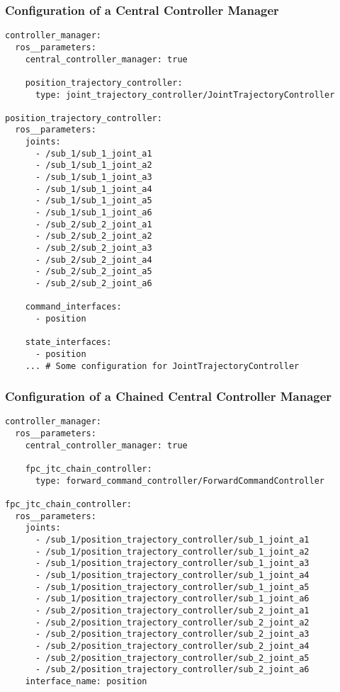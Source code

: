 \subsubsection{Configuration of a Central Controller Manager}
\lstset{language=yaml,basicstyle=\scriptsize}
\begin{lstlisting}[caption=Example configuration of a central controller manager with a joint trajecotry controller.]
controller_manager:
  ros__parameters:
    central_controller_manager: true
    
    position_trajectory_controller:
      type: joint_trajectory_controller/JointTrajectoryController

position_trajectory_controller:
  ros__parameters:
    joints:
      - /sub_1/sub_1_joint_a1
      - /sub_1/sub_1_joint_a2
      - /sub_1/sub_1_joint_a3
      - /sub_1/sub_1_joint_a4
      - /sub_1/sub_1_joint_a5
      - /sub_1/sub_1_joint_a6
      - /sub_2/sub_2_joint_a1
      - /sub_2/sub_2_joint_a2
      - /sub_2/sub_2_joint_a3
      - /sub_2/sub_2_joint_a4
      - /sub_2/sub_2_joint_a5
      - /sub_2/sub_2_joint_a6

    command_interfaces:
      - position

    state_interfaces:
      - position
    ... # Some configuration for JointTrajectoryController 
\end{lstlisting}\label{c5_l_central_controller_manager_config}

\subsubsection{Configuration of a Chained Central Controller Manager}
\lstset{language=yaml,basicstyle=\scriptsize}
\begin{lstlisting}[caption=Example configuration of a chained central controller manager.]
controller_manager:
  ros__parameters:
    central_controller_manager: true

    fpc_jtc_chain_controller:
      type: forward_command_controller/ForwardCommandController

fpc_jtc_chain_controller:
  ros__parameters:
    joints:
      - /sub_1/position_trajectory_controller/sub_1_joint_a1
      - /sub_1/position_trajectory_controller/sub_1_joint_a2
      - /sub_1/position_trajectory_controller/sub_1_joint_a3
      - /sub_1/position_trajectory_controller/sub_1_joint_a4
      - /sub_1/position_trajectory_controller/sub_1_joint_a5
      - /sub_1/position_trajectory_controller/sub_1_joint_a6
      - /sub_2/position_trajectory_controller/sub_2_joint_a1
      - /sub_2/position_trajectory_controller/sub_2_joint_a2
      - /sub_2/position_trajectory_controller/sub_2_joint_a3
      - /sub_2/position_trajectory_controller/sub_2_joint_a4
      - /sub_2/position_trajectory_controller/sub_2_joint_a5
      - /sub_2/position_trajectory_controller/sub_2_joint_a6
    interface_name: position
\end{lstlisting}\label{c5_l_chained_central_controller_manager_config}

